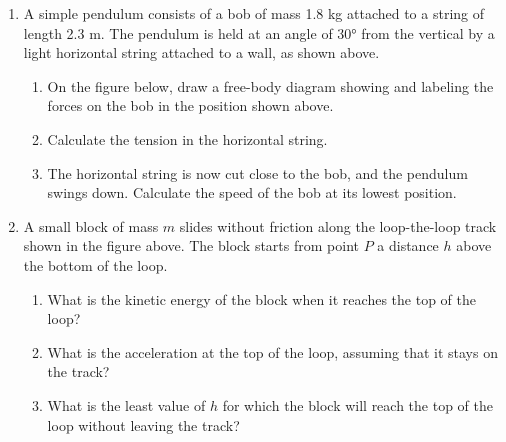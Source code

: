 \documentclass{../../../oss-apphys}
\begin{document}
\begin{enumerate}[leftmargin=15pt]
\item A simple pendulum consists of a bob of mass 1.8 kg attached to a string
  of length 2.3 m. The pendulum is held at an angle of \ang{30} from the
  vertical by a light horizontal string attached to a wall, as shown above.
  \begin{enumerate}[leftmargin=18pt,resume]
  \item On the figure below, draw a free-body diagram showing and labeling the
    forces on the bob in the position shown above.
    \begin{center}
    \end{center}
  \item Calculate the tension in the horizontal string.
  \item The horizontal string is now cut close to the bob, and the pendulum
    swings down. Calculate the speed of the bob at its lowest position.
  \end{enumerate}
  \newpage
  
  \begin{center}
  \end{center}
\item A small block of mass $m$ slides without friction along the loop-the-loop
  track shown in the figure above. The block starts from point $P$ a distance
  $h$ above the bottom of the loop.
  \begin{enumerate}[noitemsep]
  \item What is the kinetic energy of the block when it reaches the top of
    the loop?
  \item What is the acceleration at the top of the loop, assuming that it
    stays on the track?
  \item What is the least value of $h$ for which the block will reach the top
    of the loop without leaving the track?
  \end{enumerate}
  \newpage
  

\end{enumerate}
\end{document}
